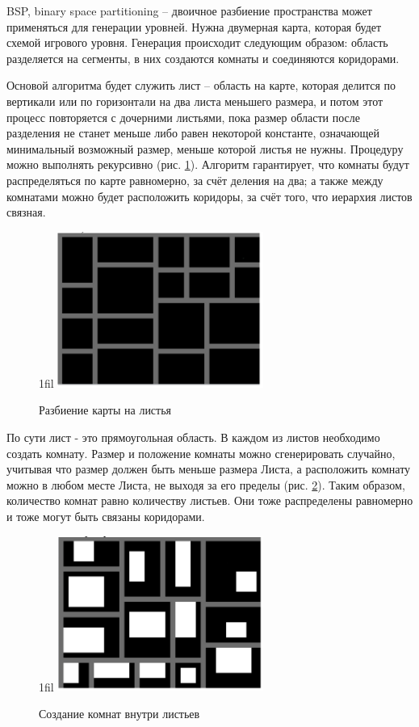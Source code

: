 \documentclass[a4paper,12pt]{report}
\makeatletter
\theoremstyle{remark}
\newcommand*{\centerfloat}{%
  \parindent \z@
  \leftskip \z@ \@plus 1fil \@minus \textwidth
  \rightskip\leftskip
  \parfillskip \z@skip}
\makeatother
\begin{document}
BSP, binary space partitioning\citep{bsp} – двоичное разбиение пространства может применяться для генерации уровней. Нужна двумерная карта, которая будет схемой игрового уровня. Генерация происходит следующим образом: область разделяется на сегменты, в них создаются комнаты и соединяются коридорами.

Основой алгоритма будет служить лист – область на карте, которая делится по вертикали или по горизонтали на два листа меньшего размера, и потом этот процесс повторяется с дочерними листьями, пока размер области после разделения не станет меньше либо равен некоторой константе, означающей минимальный возможный размер, меньше которой листья не нужны. Процедуру можно выполнять рекурсивно (рис. \ref{fig:bsp}). Алгоритм гарантирует, что комнаты будут распределяться по карте равномерно, за счёт деления на два; а также между комнатами можно будет расположить коридоры, за счёт того, что иерархия листов связная.

\begin{figure}
    \centerfloat
    \includegraphics[width=0.6\textwidth]{levels/2.png}
    \caption{Разбиение карты на листья}
    \label{fig:bsp}
\end{figure}

По сути лист - это прямоугольная область. В каждом из листов необходимо создать комнату. Размер и положение комнаты можно сгенерировать случайно, учитывая что размер должен быть меньше размера Листа, а расположить комнату можно в любом месте Листа, не выходя за его пределы (рис. \ref{fig:bsp2}). Таким образом, количество комнат равно количеству листьев. Они тоже распределены равномерно и тоже могут быть связаны коридорами.

\begin{figure}
    \centerfloat
    \includegraphics[width=0.6\textwidth]{levels/3.png}
    \caption{Создание комнат внутри листьев}
    \label{fig:bsp2}
\end{figure}
\end{document}
